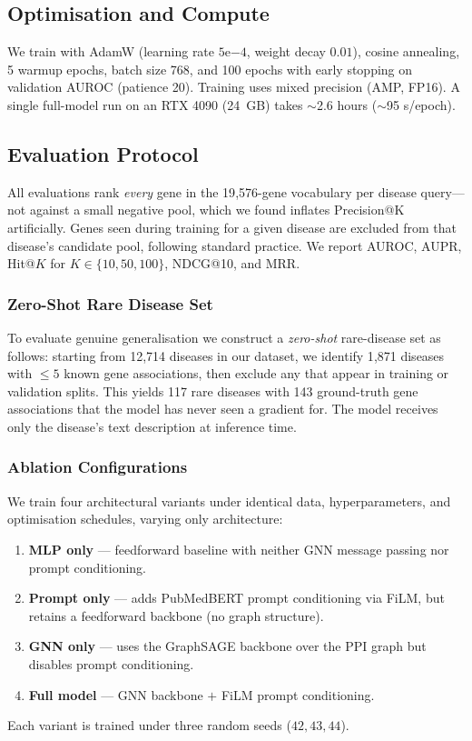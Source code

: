 \documentclass[conference]{IEEEtran}
\begin{document}
\subsection{Optimisation and Compute}
We train with AdamW (learning rate $5\mathrm{e}{-4}$, weight decay $0.01$), cosine annealing, 5 warmup epochs, batch size 768, and 100 epochs with early stopping on validation AUROC (patience 20). Training uses mixed precision (AMP, FP16). A single full-model run on an RTX 4090 (24~GB) takes $\sim$2.6 hours ($\sim$95 s/epoch).

\subsection{Evaluation Protocol}
All evaluations rank \emph{every} gene in the 19{,}576-gene vocabulary per disease query---not against a small negative pool, which we found inflates Precision@K artificially. Genes seen during training for a given disease are excluded from that disease's candidate pool, following standard practice. We report AUROC, AUPR, Hit@$K$ for $K\in\{10,50,100\}$, NDCG@10, and MRR.

\subsubsection{Zero-Shot Rare Disease Set}
To evaluate genuine generalisation we construct a \emph{zero-shot} rare-disease set as follows: starting from 12{,}714 diseases in our dataset, we identify 1{,}871 diseases with $\leq\!5$ known gene associations, then exclude any that appear in training or validation splits. This yields 117 rare diseases with 143 ground-truth gene associations that the model has never seen a gradient for. The model receives only the disease's text description at inference time.

\subsubsection{Ablation Configurations}
We train four architectural variants under identical data, hyperparameters, and optimisation schedules, varying only architecture:
\begin{enumerate}
    \item \textbf{MLP only} --- feedforward baseline with neither GNN message passing nor prompt conditioning.
    \item \textbf{Prompt only} --- adds PubMedBERT prompt conditioning via FiLM, but retains a feedforward backbone (no graph structure).
    \item \textbf{GNN only} --- uses the GraphSAGE backbone over the PPI graph but disables prompt conditioning.
    \item \textbf{Full model} --- GNN backbone $+$ FiLM prompt conditioning.
\end{enumerate}
Each variant is trained under three random seeds ($42, 43, 44$).
\end{document}
